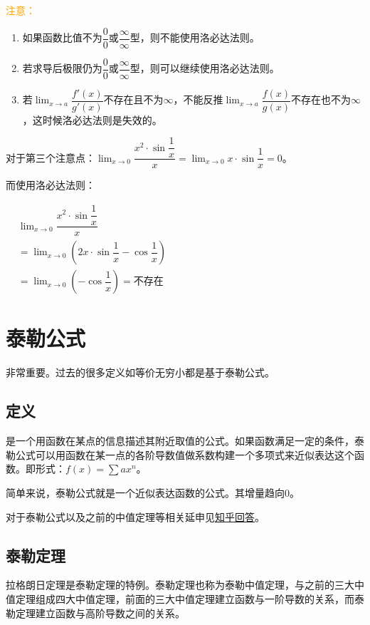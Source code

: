 \documentclass[UTF8, 12pt]{ctexart}
\begin{document}
\textcolor{orange}{注意：}

\begin{enumerate}
    \item 如果函数比值不为$\dfrac{0}{0}$或$\dfrac{\infty}{\infty}$型，则不能使用洛必达法则。
    \item 若求导后极限仍为$\dfrac{0}{0}$或$\dfrac{\infty}{\infty}$型，则可以继续使用洛必达法则。
    \item 若$\lim_{x\to a}\dfrac{f'(x)}{g'(x)}$不存在且不为$\infty$，不能反推$\lim_{x\to a}\dfrac{f(x)}{g(x)}$不存在也不为$\infty$，这时候洛必达法则是失效的。
\end{enumerate}

对于第三个注意点：$\lim_{x\to 0}\dfrac{x^2\cdot\sin\dfrac{1}{x}}{x}=\lim_{x\to 0}x\cdot\sin\dfrac{1}{x}=0$。

而使用洛必达法则：

$
\begin{aligned}
    & \lim_{x\to 0}\dfrac{x^2\cdot\sin\dfrac{1}{x}}{x} \\
    & =\lim_{x\to 0}\left(2x\cdot\sin\dfrac{1}{x}-\cos\dfrac{1}{x}\right) \\
    & =\lim_{x\to 0}\left(-\cos\dfrac{1}{x}\right)=\text{不存在}
\end{aligned}
$

\section{泰勒公式}

非常重要。过去的很多定义如等价无穷小都是基于泰勒公式。

\subsection{定义}

是一个用函数在某点的信息描述其附近取值的公式。如果函数满足一定的条件，泰勒公式可以用函数在某一点的各阶导数值做系数构建一个多项式来近似表达这个函数。即形式：$f(x)=\sum ax^n$。

简单来说，泰勒公式就是一个近似表达函数的公式。其增量趋向0。

对于泰勒公式以及之前的中值定理等相关延申见\href{https://www.zhihu.com/question/25627482}{知乎回答}。

\subsection{泰勒定理}

拉格朗日定理是泰勒定理的特例。泰勒定理也称为泰勒中值定理，与之前的三大中值定理组成四大中值定理，前面的三大中值定理建立函数与一阶导数的关系，而泰勒定理建立函数与高阶导数之间的关系。
\end{document}
